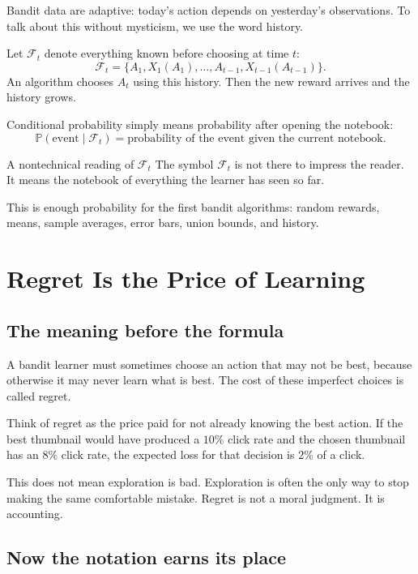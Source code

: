 \documentclass[en,nofont,11pt]{elegantbook}
\newcommand{\Pp}{\mathbb{P}}
\newcommand{\calF}{\mathcal{F}}
\begin{document}
Bandit data are adaptive: today's action depends on yesterday's observations. To talk about this without mysticism, we use the word history.

Let $\calF_t$ denote everything known before choosing at time $t$:
\[
\calF_t=\{A_1,X_1(A_1),\ldots,A_{t-1},X_{t-1}(A_{t-1})\}.
\]
An algorithm chooses $A_t$ using this history. Then the new reward arrives and the history grows.

Conditional probability simply means probability after opening the notebook:
\[
\Pp(\text{event}\mid \calF_t)
=
\text{probability of the event given the current notebook}.
\]

\begin{plainbox}{A nontechnical reading of $\calF_t$}
The symbol $\calF_t$ is not there to impress the reader. It means the notebook of everything the learner has seen so far.
\end{plainbox}

This is enough probability for the first bandit algorithms: random rewards, means, sample averages, error bars, union bounds, and history.

\chapter{Regret Is the Price of Learning}

\section{The meaning before the formula}

A bandit learner must sometimes choose an action that may not be best, because otherwise it may never learn what is best. The cost of these imperfect choices is called regret.

Think of regret as the price paid for not already knowing the best action. If the best thumbnail would have produced a $10\%$ click rate and the chosen thumbnail has an $8\%$ click rate, the expected loss for that decision is $2\%$ of a click.

This does not mean exploration is bad. Exploration is often the only way to stop making the same comfortable mistake. Regret is not a moral judgment. It is accounting.

\section{Now the notation earns its place}
\end{document}

